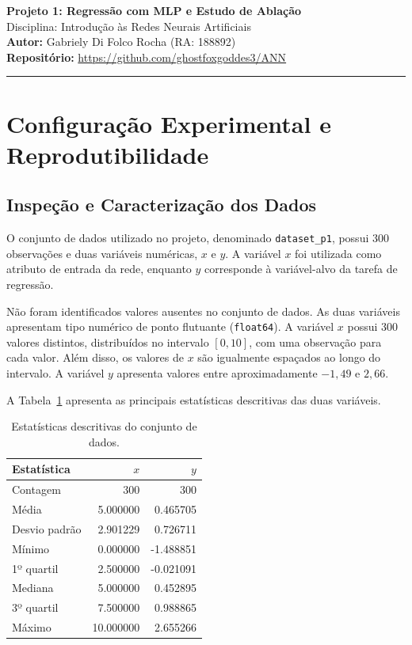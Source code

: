 \documentclass[11pt,a4paper]{article}
\begin{document}
\begin{center}
{\LARGE \textbf{Projeto 1: Regressão com MLP e Estudo de Ablação}} \\[0.35em]
{\large Disciplina: Introdução às Redes Neurais Artificiais} \\[0.3em]
\textbf{Autor:} Gabriely Di Folco Rocha (RA: 188892) \\[0.2em]
\textbf{Repositório:} \url{https://github.com/ghostfoxgoddes3/ANN}
\end{center}

\vspace{-0.5em}
\hrule
\vspace{0.8em}


\section{Configuração Experimental e Reprodutibilidade}

\subsection{Inspeção e Caracterização dos Dados}

O conjunto de dados utilizado no projeto, denominado
\texttt{dataset\_p1}, possui 300 observações e duas variáveis numéricas,
$x$ e $y$. A variável $x$ foi utilizada como atributo de entrada da
rede, enquanto $y$ corresponde à variável-alvo da tarefa de regressão.

Não foram identificados valores ausentes no conjunto de dados. As duas
variáveis apresentam tipo numérico de ponto flutuante
(\texttt{float64}). A variável $x$ possui 300 valores distintos,
distribuídos no intervalo $[0,10]$, com uma observação para cada valor.
Além disso, os valores de $x$ são igualmente espaçados ao longo do
intervalo. A variável $y$ apresenta valores entre aproximadamente
$-1,49$ e $2,66$.

A Tabela~\ref{tab:dataset_summary} apresenta as principais estatísticas
descritivas das duas variáveis.

\begin{table}[H]
\centering
\small
\caption{Estatísticas descritivas do conjunto de dados.}
\label{tab:dataset_summary}
\begin{tabular}{lrr}
\toprule
\textbf{Estatística} & \textbf{$x$} & \textbf{$y$} \\
\midrule
Contagem & 300 & 300 \\
Média & 5.000000 & 0.465705 \\
Desvio padrão & 2.901229 & 0.726711 \\
Mínimo & 0.000000 & -1.488851 \\
1º quartil & 2.500000 & -0.021091 \\
Mediana & 5.000000 & 0.452895 \\
3º quartil & 7.500000 & 0.988865 \\
Máximo & 10.000000 & 2.655266 \\
\bottomrule
\end{tabular}
\end{table}
\end{document}
